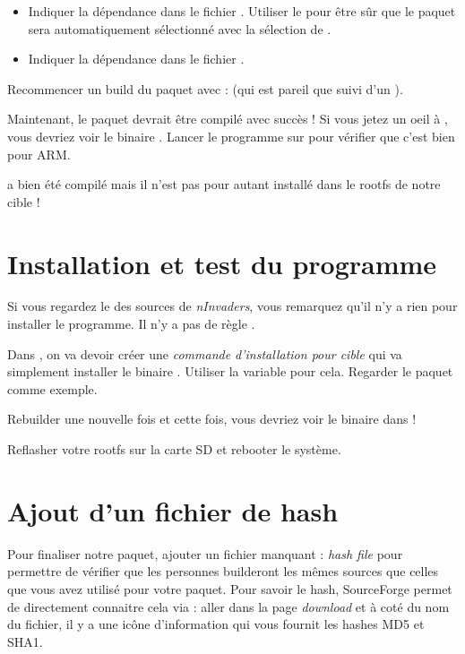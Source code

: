 \begin{itemize}

\item Indiquer la dépendance dans le fichier . Utiliser le
   pour être sûr que le paquet  sera automatiquement
  sélectionné avec la sélection de .
\item Indiquer la dépendance dans le fichier .

\end{itemize}

Recommencer un build du paquet avec :
 (qui est pareil que
 suivi d'un ).

Maintenant, le paquet devrait être compilé avec succès !
Si vous jetez un oeil à , vous devriez
voir le binaire . Lancer le programme  sur
 pour vérifier que c'est bien pour ARM.

 a bien été compilé mais il n'est pas pour autant installé
dans le rootfs de notre cible !

\section{Installation et test du programme}

Si vous regardez le  des sources de {\em nInvaders},
vous remarquez qu'il n'y a rien pour installer le programme. Il n'y a pas
de règle .

Dans , on va devoir créer une {\em commande d'installation
  pour cible} qui va simplement installer le binaire .
Utiliser la variable  pour cela. Regarder le paquet
 comme exemple.

Rebuilder une nouvelle fois  et cette fois, vous devriez
voir le binaire  dans !

Reflasher votre rootfs sur la carte SD et rebooter le système.

\section{Ajout d'un fichier de hash}

Pour finaliser notre paquet, ajouter un fichier manquant : {\em hash file}
pour permettre de vérifier que les personnes builderont les mêmes sources
que celles que vous avez utilisé pour votre paquet. Pour savoir le hash,
SourceForge permet de directement connaitre cela via :
aller dans la page {\em download} et à coté du nom du fichier, il y a une
icône d'information qui vous fournit les hashes MD5 et SHA1.


